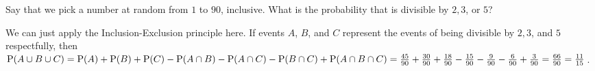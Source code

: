 \question Say that we pick a number at random from $1$ to $90$, inclusive. What is the probability that is divisible by $2, 3$, or $5$?\\

\begin{solution}[1 cm]
We can just apply the Inclusion-Exclusion principle here. If events $A$, $B$, and $C$ represent the events of being divisible by $2, 3$, and $5$ respectfully, then $\P(A\cup B \cup C) = \P(A) + \P(B) + \P(C) - \P(A \cap B) - \P(A \cap C) - \P(B \cap C) + \P(A\cap B \cap C) = \frac{45}{90} + \frac{30}{90} + \frac{18}{90} - \frac{15}{90} - \frac{9}{90} - \frac{6}{90} + \frac{3}{90} = \frac{66}{90} = \frac{11}{15}$.
\end{solution}	